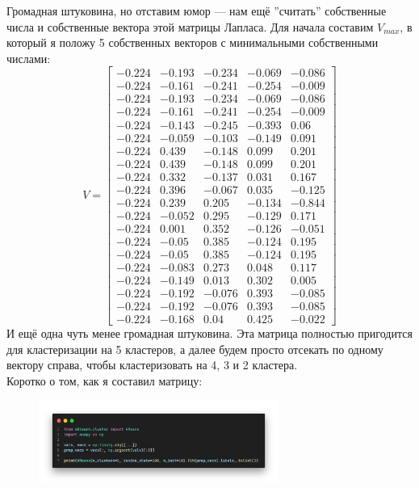 \documentclass[a3paper,14pt]{extarticle}
\begin{document}
\pagebreak\noindent Громадная штуковина, но отставим юмор --- нам ещё ''считать'' собственные числа и собственные вектора этой матрицы Лапласа. Для начала составим $V_{max}$, в который я положу 5 собственных векторов с минимальными собственными числами:
$$V = \left[\begin{array}{rrrrr}
    -0.224 & -0.193 & -0.234 & -0.069 & -0.086 \\
    -0.224 & -0.161 & -0.241 & -0.254 & -0.009 \\
    -0.224 & -0.193 & -0.234 & -0.069 & -0.086 \\
    -0.224 & -0.161 & -0.241 & -0.254 & -0.009 \\
    -0.224 & -0.143 & -0.245 & -0.393 & 0.06 \\
    -0.224 & -0.059 & -0.103 & -0.149 & 0.091 \\
    -0.224 & 0.439 & -0.148 & 0.099 & 0.201 \\
    -0.224 & 0.439 & -0.148 & 0.099 & 0.201 \\
    -0.224 & 0.332 & -0.137 & 0.031 & 0.167 \\
    -0.224 & 0.396 & -0.067 & 0.035 & -0.125 \\
    -0.224 & 0.239 & 0.205 & -0.134 & -0.844 \\
    -0.224 & -0.052 & 0.295 & -0.129 & 0.171 \\
    -0.224 & 0.001 & 0.352 & -0.126 & -0.051 \\
    -0.224 & -0.05 & 0.385 & -0.124 & 0.195 \\
    -0.224 & -0.05 & 0.385 & -0.124 & 0.195 \\
    -0.224 & -0.083 & 0.273 & 0.048 & 0.117 \\
    -0.224 & -0.149 & 0.013 & 0.302 & 0.005 \\
    -0.224 & -0.192 & -0.076 & 0.393 & -0.085 \\
    -0.224 & -0.192 & -0.076 & 0.393 & -0.085 \\
    -0.224 & -0.168 & 0.04 & 0.425 & -0.022
\end{array}\right]$$
И ещё одна чуть менее громадная штуковина. Эта матрица полностью пригодится для кластеризации на 5 кластеров, а далее будем просто отсекать по одному вектору справа, чтобы кластеризовать на 4, 3 и 2 кластера.\\[1em]
Коротко о том, как я составил матрицу:
\begin{figure}[h]
    \centering\includegraphics[width=0.7\textwidth]{1code.png}
\end{figure} \\
\end{document}
